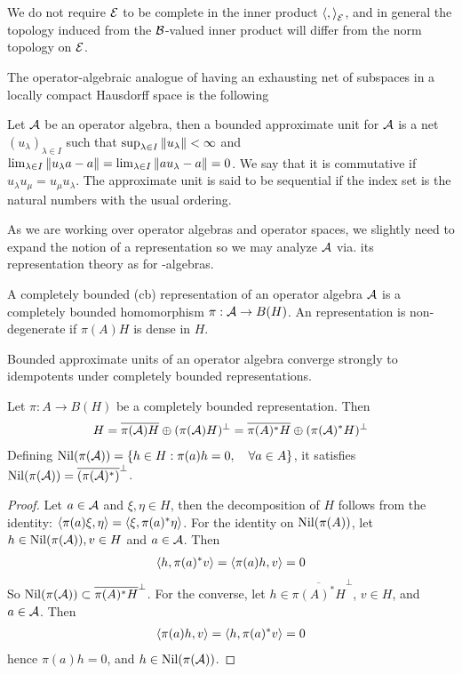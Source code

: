 \begin{remark}
	We do not require $\mathcal{E}$ to be complete in the inner product $\left \langle , \right \rangle_{\mathcal{E}}$, and in general the topology induced from the $\mathcal{B}$-valued inner product will differ from the norm topology on $\mathcal{E}$. 
\end{remark}

The operator-algebraic analogue of having an exhausting net of subspaces in a locally compact Hausdorff space is the following 
\begin{definition}
	Let $\mathcal{A}$ be an operator algebra, then a bounded approximate unit for $\mathcal{A}$ is a net $(u_{\lambda})_{\lambda\in I}$ such that $\sup_{\lambda \in I}\left \Vert u_{\lambda} \right \Vert<\infty$ and $\lim_{\lambda\in I}\left \Vert u_\lambda a-a  \right \Vert=\lim_{\lambda \in I}\left \Vert au_{\lambda}-a \right \Vert=0$. We say that it is commutative if $u_{\lambda}u_{\mu}=u_{\mu}u_{\lambda}$. The approximate unit is said to be sequential if the index set is the natural numbers with the usual ordering. 
\end{definition}
As we are working over operator algebras and operator spaces, we slightly need to expand the notion of a representation so we may analyze $\mathcal{A}$ via. its representation theory as for \Cstar-algebras. 
\begin{definition}
	A completely bounded (cb) representation of an operator algebra $\mathcal{A}$ is a completely bounded homomorphism $\pi:\mathcal{A}\to B(H)$. An representation is non-degenerate if $\pi(A)H$ is dense in $H$. 
\end{definition}
Bounded approximate units of an operator algebra converge strongly to idempotents under completely bounded representations. 
\begin{lemma}
	Let $\pi:A\to B(H)$ be a completely bounded representation. Then
	\begin{align*}
		H=\overline{\pi(\mathcal{A})H}\oplus (\pi(\mathcal{A})H)^\perp=\overline{\pi(A)^*H}\oplus (\pi(\mathcal{A})^* H)^\perp
	\end{align*}
	Defining $\operatorname{Nil}(\pi(\mathcal{A}))=\{h\in H: \pi(a)h=0, \quad \forall a\in A\}$, it satisfies $\operatorname{Nil}(\pi(\mathcal{A}))=\overline{(\pi(\mathcal{A})^*)}^{\perp}$. 
\end{lemma}
\begin{proof}
	Let $a\in \mathcal{A}$ and $\xi,\eta\in H$, then the decomposition of $H$ follows from the identity: $\left \langle \pi(a)\xi,\eta \right \rangle=\left \langle \xi,\pi(a)^*\eta \right \rangle$. 
	For the identity on $\operatorname{Nil}(\pi(A))$, let $h\in \operatorname{Nil}(\pi(\mathcal{A})),v\in H$ and $a\in \mathcal{A}$. Then 
	\begin{align*}
		\left \langle h,\pi(a)^*v \right \rangle=\left \langle \pi(a)h,v \right \rangle=0
	\end{align*}
	So $\operatorname{Nil}(\pi(\mathcal{A}))\subset \overline{\pi(A)^*H}^\perp$. For the converse, let $h\in  \overline{\pi(A)^*H}^\perp$, $v\in H$, and $a\in \mathcal{A}$. Then 
	\begin{align*}
		\left \langle \pi(a)h,v \right \rangle=\left \langle h,\pi(a)^*v \right \rangle=0
	\end{align*}
	hence $\pi(a)h=0$, and $h\in \operatorname{Nil}(\pi(\mathcal{A}))$.  
\end{proof}

